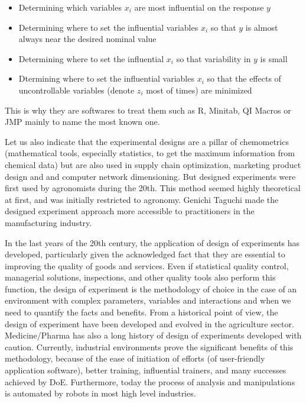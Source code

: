 	\begin{itemize}
		\item Determining which variables $x_i$ are most influential on the response $y$
		
		\item Determining where to set the influential variables $x_i$ so that $y$ is almost always near the desired nominal value
		
		\item Determining where to set the influential $x_i$ so that variability in $y$ is small
		
		\item Dtermining where to set the influential variables $x_i$ so that the effects of uncontrollable variables (denote $z_i$ most of times) are minimized
	\end{itemize}
	This is why they are softwares to treat them such as R, Minitab, QI Macros or JMP mainly to name the most known one.
	
	Let us also indicate that the experimental designs are a pillar of chemometrics (mathematical tools, especially statistics, to get the maximum information from chemical data) but are also used in supply chain optimization, marketing product design and and computer network dimensioning. But designed experiments were first used by agronomists during the 20th. This method seemed highly theoretical at first, and was initially restricted to agronomy. Genichi Taguchi made the designed experiment approach more accessible to practitioners in the manufacturing industry.

	In the last years of the 20th century, the application of design of experiments has developed, particularly given the acknowledged fact that they are essential to improving the quality of goods and services. Even if statistical quality control, managerial solutions, inspections, and other quality tools also perform this function, the design of experiment is the methodology of choice in the case of an environment with complex parameters, variables and interactions and when we need to quantify the facts and benefits. From a historical point of view, the design of experiment have been developed and evolved in the agriculture sector. Medicine/Pharma has also a long history of design of experiments developed with caution. Currently, industrial environments prove the significant benefits of this methodology, because of the ease of initiation of efforts (of user-friendly application software), better training, influential trainers, and many successes achieved by DoE. Furthermore, today the process of analysis and manipulations is automated by robots in most high level industries.
	
